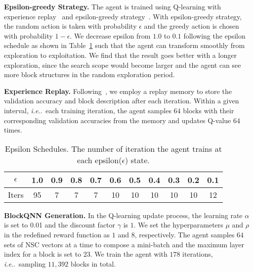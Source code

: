 \documentclass[10pt,journal,compsoc]{IEEEtran}
\makeatletter
\DeclareRobustCommand\onedot{\futurelet\@let@token\@onedot}
\def\@onedot{\ifx\@let@token.\else.\null\fi\xspace}
\def\ie{\emph{i.e}\onedot} \def\Ie{\emph{I.e}\onedot}
\makeatother
\begin{document}
\vspace{0.1cm}\noindent \textbf{Epsilon-greedy Strategy.} The agent is trained using Q-learning with experience replay~\cite{lin1993reinforcement} and epsilon-greedy strategy~\cite{mnih2015human}. %
With epsilon-greedy strategy, the random action is taken with probability $\epsilon$ and the greedy action is chosen with probability $1-\epsilon$. We decrease epsilon from $1.0$ to $0.1$ following the epsilon schedule as shown in Table~\ref{table:2} such that the agent can transform smoothly from exploration to exploitation. We find that the result goes better with a longer exploration, since the search scope would become larger and the agent can see more block structures in the random exploration period. 

\vspace{0.1cm}\noindent\textbf{Experience Replay.} Following~\cite{baker2016designing}, we employ a replay memory to store the validation accuracy and block description after each iteration. Within a given interval, \ie~each training iteration, the agent samples $64$ blocks with their corresponding validation accuracies from the memory and updates Q-value $64$ times.
\begin{table}[t!]
	\renewcommand{\arraystretch}{1.3}

	\begin{center}
    	\caption{Epsilon Schedules. The number of iteration the agent trains at each epsilon($\epsilon$) state.}\label{table:2}			
		\scriptsize
		\begin{tabular}{c|c|c|c|c|c|c|c|c|c|c}
			\hline
			$\epsilon$&1.0& 0.9 & 0.8 & 0.7 & 0.6 & 0.5 & 0.4 & 0.3 & 0.2 & 0.1 \\
			\hline
			Iters&95& 7 & 7 & 7 & 10 & 10 & 10 & 10 & 10 & 12 \\
			\hline
		\end{tabular}
	\end{center}

\end{table}



\vspace{0.1cm}\noindent \textbf{BlockQNN Generation.} In the Q-learning update process, the learning rate \(\alpha\) is set to 0.01 and the discount factor \(\gamma\) is $1$. We set the hyperparameters $\mu$ and $\rho$ in the redefined reward function as $1$ and $8$, respectively. The agent samples $64$ sets of NSC vectors at a time to compose a mini-batch and the maximum layer index for a block is set to $23$. We train the agent with $178$ iterations, \ie~sampling $11,392$ blocks in total. 
\end{document}
